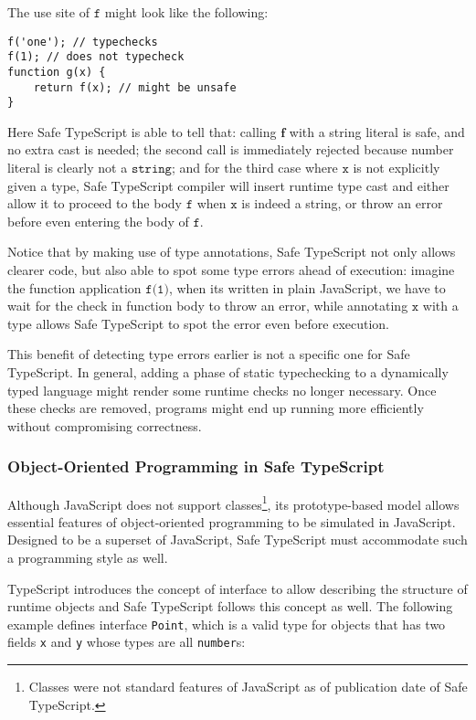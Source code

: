The use site of $\texttt{f}$ might look like the following:

\begin{verbatim}
f('one'); // typechecks
f(1); // does not typecheck
function g(x) {
    return f(x); // might be unsafe
}
\end{verbatim}

Here Safe TypeScript is able to tell that:
calling $\textbf{f}$ with a string literal
is safe, and no extra cast is needed; the second call is immediately rejected
because number literal is clearly not a $\texttt{string}$;
and for the third case where $\texttt{x}$
is not explicitly given a type, Safe TypeScript compiler will insert runtime type cast
and either allow it to proceed to the body $\texttt{f}$ when $\texttt{x}$ is indeed a string,
or throw an error before even entering the body of $\texttt{f}$.

Notice that by making use of type annotations, Safe TypeScript not only allows
clearer code, but also able to spot some type errors ahead of execution:
imagine the function application $\texttt{f(1)}$, when its written in plain JavaScript,
we have to wait for the check in function body to throw an error,
while annotating $\texttt{x}$ with a type allows Safe TypeScript
to spot the error even before execution.

This benefit of detecting type errors earlier is not a specific one for Safe TypeScript.
In general, adding a phase of static typechecking to a dynamically typed language
might render some runtime checks no longer necessary.
Once these checks are removed,
programs might end up running more efficiently without compromising correctness.


\subsubsection{Object-Oriented Programming in Safe TypeScript}

Although JavaScript does not support classes\footnote{
	Classes were not standard features of JavaScript
	as of publication date of Safe TypeScript.
},
its prototype-based model allows essential features of object-oriented
programming to be simulated in JavaScript.
Designed to be a superset of JavaScript, Safe TypeScript must accommodate such a programming
style as well.

TypeScript introduces the concept of interface to allow describing
the structure of runtime objects and Safe TypeScript follows this concept as well.
The following example defines
interface \texttt{Point}, which is a valid type for objects
that has two fields \texttt{x} and \texttt{y} whose types are all \texttt{number}s:

